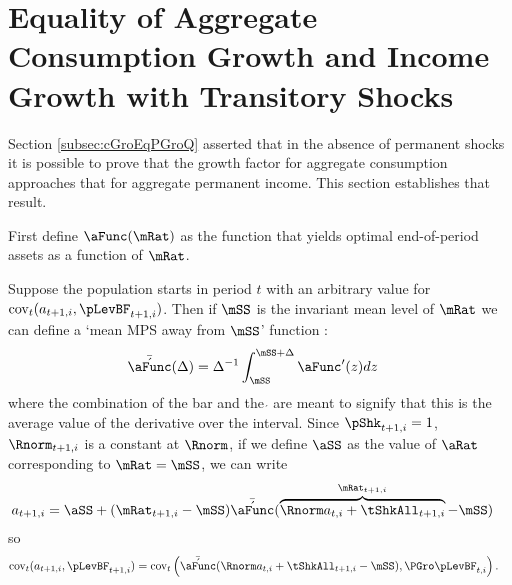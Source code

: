 \documentclass[\econtexRoot/BufferStockTheory]{subfiles}
\begin{document}
\section{Equality of Aggregate Consumption Growth and Income Growth with Transitory Shocks}\label{sec:ApndxCGroIsPGro}

Section \ref{subsec:cGroEqPGroQ} asserted that in the absence of permanent shocks it is possible to prove
that the growth factor for aggregate consumption approaches that for aggregate permanent
income.  This section establishes that result.

First define $\aFunc(\mRat)$ as the function that yields optimal end-of-period assets as a function of $\mRat$.

Suppose the population starts in period $t$ with an arbitrary value for
 $\mbox{cov}_{t}(a_{t+1,i},\pLevBF_{t+1,i})$. 
 Then if $\mSS$ is the invariant mean level of $\mRat$ we can define a `mean MPS away from $\mSS$' function
 \newcommand{\AMPS}{\bar{\acute{\aFunc}}}:
\begin{equation}\begin{gathered}\begin{aligned}
 \AMPS(\Delta)  & =  \Delta^{-1}\int_{\mSS}^{\mSS+\Delta} \aFunc^{\prime}(z)
 dz \label{eq:checkaFunc} \nonumber
\end{aligned}\end{gathered}\end{equation}
where the combination of the bar and the $\acute{}$ are meant to signify that this is the average value of the derivative over the interval.
Since $\pShk_{t+1,i}=1$, $\Rnorm_{t+1,i}$ is a constant at $\Rnorm$, if we define $\aSS$ as the value of $\aRat$ corresponding to $\mRat = \mSS$, we can write
\begin{equation}\begin{gathered}\begin{aligned}
  a_{t+1,i} 
& =   \aSS+(\mRat_{t+1,i}-\mSS)\AMPS(\overbrace{\Rnorm
    a_{t,i}+\tShkAll_{t+1,i}}^{\mRat_{t+1,i}}-\mSS) \nonumber
\end{aligned}\end{gathered}\end{equation}
so
\begin{equation}\begin{gathered}\begin{aligned}
\mbox{cov}_{t}(a_{t+1,i},\pLevBF_{t+1,i})
 & = \mbox{cov}_{t}\left(\AMPS(\Rnorm  a_{t,i}+\tShkAll_{t+1,i}-\mSS)
  ,\PGro   \pLevBF_{t,i}\right). \nonumber
\end{aligned}\end{gathered}\end{equation}
\end{document}
